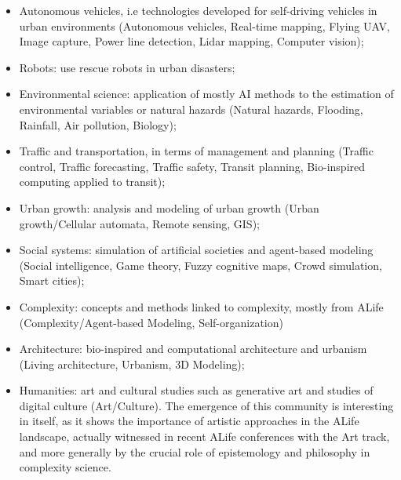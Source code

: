 \documentclass[letterpaper]{article}
\begin{document}
\begin{itemize}
	\item Autonomous vehicles, i.e technologies developed for self-driving vehicles in urban environments (Autonomous vehicles, Real-time mapping, Flying UAV, Image capture, Power line detection, Lidar mapping, Computer vision);
	\item Robots: use rescue robots in urban disasters;
	\item Environmental science: application of mostly AI methods to the estimation of environmental variables or natural hazards (Natural hazards, Flooding, Rainfall, Air pollution, Biology);
	\item Traffic and transportation, in terms of management and planning (Traffic control, Traffic forecasting, Traffic safety, Transit planning, Bio-inspired computing applied to transit);
	\item Urban growth: analysis and modeling of urban growth (Urban growth/Cellular automata, Remote sensing, GIS);
	\item Social systems: simulation of artificial societies and agent-based modeling (Social intelligence, Game theory, Fuzzy cognitive maps, Crowd simulation, Smart cities);
	\item Complexity: concepts and methods linked to complexity, mostly from ALife (Complexity/Agent-based Modeling, Self-organization)
	\item Architecture: bio-inspired and computational architecture and urbanism (Living architecture, Urbanism, 3D Modeling);
	\item Humanities: art and cultural studies such as generative art and studies of digital culture (Art/Culture). The emergence of this community is interesting in itself, as it shows the importance of artistic approaches in the ALife landscape, actually witnessed in recent ALife conferences with the Art track, and more generally by the crucial role of epistemology and philosophy in complexity science.
\end{itemize}
\end{document}

